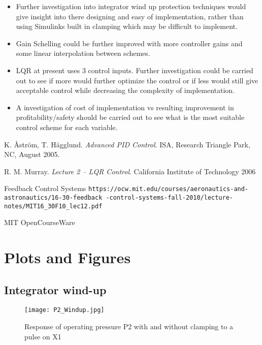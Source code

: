 \documentclass[11pt]{article}
\begin{document}
\begin{itemize}
    \item Further investigation into integrator wind up protection techniques would give insight into there designing and easy of implementation, rather than using Simulinks built in clamping which may be difficult to implement.
    \item Gain Schelling could be further improved with more controller gains and some linear interpolation between schemes.
    \item LQR at present uses 3 control inputs. Further investigation could be carried out to see if more would further optimize the control or if less would still give acceptable control while decreasing the complexity of implementation.
    \item A investigation of cost of implementation vs resulting improvement in profitability/safety should be carried out to see what is the most suitable control scheme for each variable.
\end{itemize}

\begin{thebibliography}{9}
K. Åström, T. Hägglund. 
\textit{Advanced PID Control}. 
ISA, Research Triangle Park, NC, August 2005.
 
R. M. Murray. 
\textit{Lecture 2 – LQR Control}.
California Institute of Technology 2006
 
Feedback Control Systems \newline
\texttt{https://ocw.mit.edu/courses/aeronautics-and-astronautics/16-30-feedback
\newline
-control-systems-fall-2010/lecture-notes/MIT16\_30F10\_lec12.pdf}

MIT OpenCourseWare

\end{thebibliography}

\appendix
\section{Plots and Figures}

\subsection{Integrator wind-up }

\begin{figure}[H]
    \centering
    \texttt{[image: P2\_Windup.jpg]}
    \caption{Response of operating pressure P2 with and without clamping to a pulse on X1}
    \label{fig:P2_Windup}
\end{figure}
\end{document}
